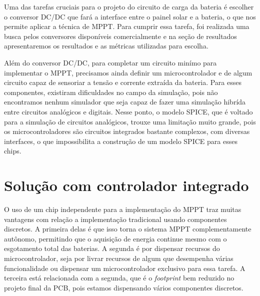 Uma das tarefas cruciais para o projeto do circuito de carga da bateria é escolher o conversor DC/DC que fará a interface entre o painel solar e a bateria, o que nos permite aplicar a técnica de MPPT. Para cumprir essa tarefa, foi realizada uma busca pelos conversores disponíveis comercialmente e na seção de resultados apresentaremos os resultados e as métricas utilizadas para escolha. 

Além do conversor DC/DC, para completar um circuito minímo para implementar o MPPT, precisamos ainda definir um microcontrolador e de algum circuito capaz de sensoriar a tensão e corrente extraída da bateria. Para esses componentes, existiram dificuldades no campo da simulação, pois não encontramos nenhum simulador que seja capaz de fazer uma simulação hibrída entre circuitos analógicos e digitais. Nesse ponto, o modelo SPICE, que é voltado para a simulação de circuitos analógicos, trouxe uma limitação muito grande, pois os microcontroladores são circuitos integrados bastante complexos, com diversas interfaces, o que impossibilita a construção de um modelo SPICE para esses chips.


\section{Solução com controlador integrado}

O uso de um chip independente para a implementação do MPPT traz muitas vantagens com relação a implementação tradicional usando componentes discretos. A primeira delas é que isso torna o sistema MPPT complementamente autônomo, permitindo que o aquisição de energia continue mesmo com o esgotamento total das baterias. A segunda é por dispensar recursos do microcontrolador, seja por livrar recursos de algum que desempenha várias funcionalidade ou dispensar um microcontrolador exclusivo para essa tarefa. A terceira está relacionada com a segunda, que é o \textit{footprint} bem reduzido no projeto final da PCB, pois estamos dispensando vários componentes discretos.




